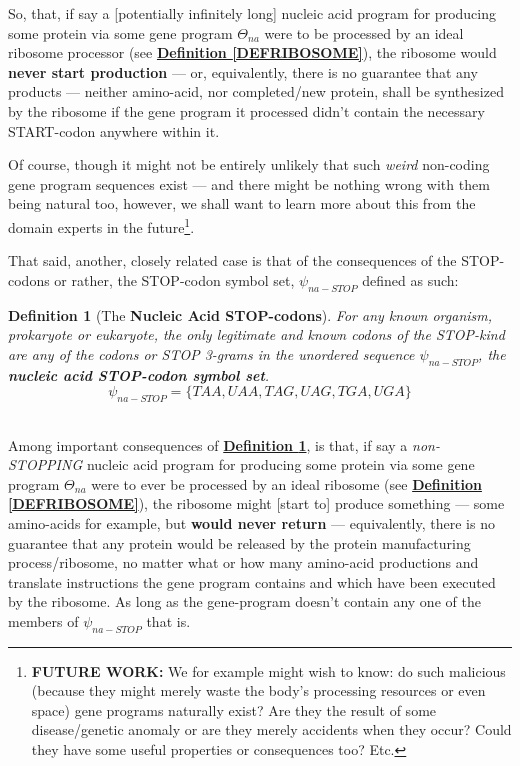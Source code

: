 \documentclass[a4paper, 18pt]{book} %
\newtheorem{defn}{Definition}
\begin{document}
So, that, if say a [potentially infinitely long] nucleic acid program for producing some protein via some gene program $\Theta_{na}$ were to be processed by an ideal ribosome processor (see \textbf{\hyperref[DEFRIBOSOME]{Definition \ref{DEFRIBOSOME}}}), the ribosome would \textbf{never start production} --- or, equivalently, there is no guarantee that any products --- neither amino-acid, nor completed/new protein, shall be synthesized by the ribosome if the gene program it processed didn't contain the necessary START-codon anywhere within it.

Of course, though it might not be entirely unlikely that such \textit{weird} non-coding gene program sequences exist --- and there might be nothing wrong with them being natural too, however, we shall want to learn more about this from the domain experts in the future\footnote{\textbf{FUTURE WORK:} We for example might wish to know: do such malicious (because they might merely waste the body's processing resources or even space) gene programs naturally exist? Are they the result of some disease/genetic anomaly or are they merely accidents when they occur? Could they have some useful properties or consequences too? Etc.}.

That said, another, closely related case is that of the consequences of the STOP-codons or rather, the STOP-codon symbol set, $\psi_{na-STOP}$ defined as such:


\begin{defn}[The \textbf{Nucleic Acid STOP-codons}]
\label{DEFSTOPCOD}
For any known organism, prokaryote or eukaryote, the only legitimate and known codons of the STOP-kind are any of the codons or STOP 3-grams in the unordered sequence $\psi_{na-STOP}$, the \textbf{nucleic acid STOP-codon symbol set}.\\

\begin{equation}
\label{EQNNASSSTOP}
\psi_{na-STOP} = \{TAA,UAA,TAG,UAG,TGA,UGA\}
\end{equation}\\
\end{defn} 

Among important consequences of \textbf{\hyperref[DEFSTOPCOD]{Definition \ref{DEFSTOPCOD}}}, is that, if say a \textit{non-STOPPING} nucleic acid program for producing some protein via some gene program $\Theta_{na}$ were to ever be processed by an ideal ribosome (see \textbf{\hyperref[DEFRIBOSOME]{Definition \ref{DEFRIBOSOME}}}), the ribosome might [start to] produce something --- some amino-acids for example, but \textbf{would never return} --- equivalently, there is no guarantee that any protein would be released by the protein manufacturing process/ribosome, no matter what or how many amino-acid productions and translate instructions the gene program contains and which have been executed by the ribosome. As long as the gene-program doesn't contain any one of the members of $\psi_{na-STOP}$ that is.
\end{document}
